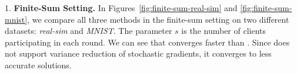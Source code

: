 \documentclass[10pt]{article}
\begin{document}
{1. \bf Finite-Sum Setting.} In Figures~\ref{fig:finite-sum-real-sim} and \ref{fig:finite-sum-mnist}, we compare all three methods in the finite-sum setting on two different datasets: \textit{real-sim} and \textit{MNIST}. The parameter $s$ is the number of clients participating in each round.
We can see that  converges faster than . Since  does not support variance reduction of stochastic gradients, it converges to less accurate solutions.
\vspace{-0.3cm}
\end{document}

